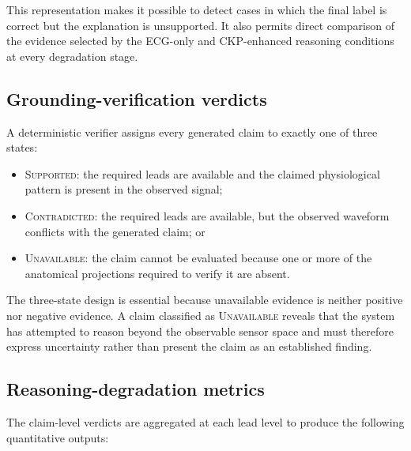 \documentclass{ssnreview}
\begin{document}
This representation makes it possible to detect cases in which the final label is correct but
the explanation is unsupported. It also permits direct comparison of the evidence selected
by the ECG-only and CKP-enhanced reasoning conditions at every degradation stage.

\subsection{Grounding-verification verdicts}

A deterministic verifier assigns every generated claim to exactly one of three states:

\begin{itemize}
  \item \textsc{Supported}: the required leads are available and the claimed physiological
  pattern is present in the observed signal;

  \item \textsc{Contradicted}: the required leads are available, but the observed waveform
  conflicts with the generated claim; or

  \item \textsc{Unavailable}: the claim cannot be evaluated because one or more of the
  anatomical projections required to verify it are absent.
\end{itemize}

The three-state design is essential because unavailable evidence is neither positive nor
negative evidence. A claim classified as \textsc{Unavailable} reveals that the system has
attempted to reason beyond the observable sensor space and must therefore express
uncertainty rather than present the claim as an established finding.

\subsection{Reasoning-degradation metrics}

The claim-level verdicts are aggregated at each lead level to produce the following
quantitative outputs:
\end{document}
